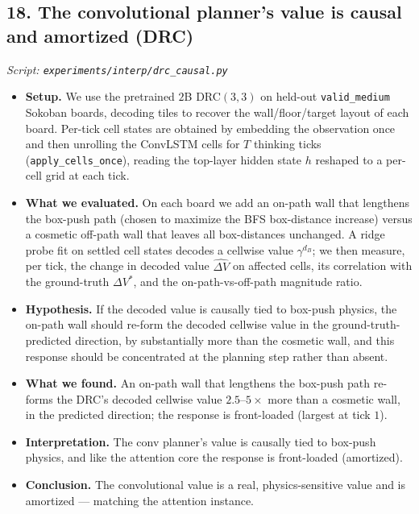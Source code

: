 \documentclass[11pt]{article}
\begin{document}
\subsection*{18. The convolutional planner's value is causal and amortized (DRC)}
\textit{Script: \texttt{experiments/interp/drc\_causal.py}}
\begin{itemize}
\item \textbf{Setup.} We use the pretrained $2$B DRC$(3,3)$ on held-out \texttt{valid\_medium} Sokoban boards, decoding tiles to recover the wall/floor/target layout of each board. Per-tick cell states are obtained by embedding the observation once and then unrolling the ConvLSTM cells for $T$ thinking ticks (\texttt{apply\_cells\_once}), reading the top-layer hidden state $h$ reshaped to a per-cell grid at each tick.
\item \textbf{What we evaluated.} On each board we add an on-path wall that lengthens the box-push path (chosen to maximize the BFS box-distance increase) versus a cosmetic off-path wall that leaves all box-distances unchanged. A ridge probe fit on settled cell states decodes a cellwise value $\gamma^{d_B}$; we then measure, per tick, the change in decoded value $\widehat{\Delta V}$ on affected cells, its correlation with the ground-truth $\Delta V^{*}$, and the on-path-vs-off-path magnitude ratio.
\item \textbf{Hypothesis.} If the decoded value is causally tied to box-push physics, the on-path wall should re-form the decoded cellwise value in the ground-truth-predicted direction, by substantially more than the cosmetic wall, and this response should be concentrated at the planning step rather than absent.
\item \textbf{What we found.} An on-path wall that lengthens the box-push path re-forms the DRC's decoded cellwise value $2.5$--$5\times$ more than a cosmetic wall, in the predicted direction; the response is front-loaded (largest at tick $1$).
\item \textbf{Interpretation.} The conv planner's value is causally tied to box-push physics, and like the attention core the response is front-loaded (amortized).
\item \textbf{Conclusion.} The convolutional value is a real, physics-sensitive value and is amortized --- matching the attention instance.
\end{itemize}
\clearpage
\end{document}
